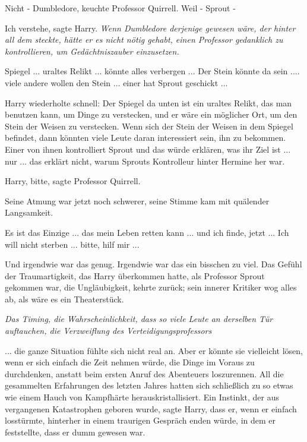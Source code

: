 \glqq{}Nicht - Dumbledore\grqq{}, keuchte Professor Quirrell. \glqq{}Weil - Sprout
-\grqq{}

\glqq{}Ich verstehe\grqq{}, sagte Harry. \emph{Wenn Dumbledore derjenige gewesen
wäre, der hinter all dem steckte, hätte er es nicht nötig gehabt, einen
Professor gedanklich zu kontrollieren, um Gedächtniszauber einzusetzen.}

\glqq{}Spiegel ... uraltes Relikt ... könnte alles verbergen ... Der Stein könnte da
sein .... viele andere wollen den Stein ... einer hat Sprout geschickt ...\grqq{}

Harry wiederholte schnell: \glqq{}Der Spiegel da unten ist ein uraltes Relikt,
das man benutzen kann, um Dinge zu verstecken, und er wäre ein möglicher Ort, um
den Stein der Weisen zu verstecken. Wenn sich der Stein der Weisen in dem
Spiegel befindet, dann könnten viele Leute daran interessiert sein, ihn zu
bekommen. Einer von ihnen kontrolliert Sprout und das würde erklären, was ihr
Ziel ist ... nur ... das erklärt nicht, warum Sprouts Kontrolleur hinter Hermine
her war.\grqq{}

\glqq{}Harry, bitte\grqq{}, sagte Professor Quirrell.

Seine Atmung war jetzt noch schwerer, seine Stimme kam mit quälender
Langsamkeit.

\glqq{}Es ist das Einzige ... das mein Leben retten kann ... und ich finde,
jetzt ... Ich will nicht sterben ... bitte, hilf mir ...\grqq{}

Und irgendwie war das genug. Irgendwie war das ein bisschen zu viel. Das Gefühl
der Traumartigkeit, das Harry überkommen hatte, als Professor Sprout gekommen
war, die Ungläubigkeit, kehrte zurück; sein innerer Kritiker wog alles ab, als
wäre es ein Theaterstück.

\emph{Das Timing, die Wahrscheinlichkeit, dass so viele Leute an derselben Tür
auftauchen, die Verzweiflung des Verteidigungsprofessors}

... die ganze Situation fühlte sich nicht real an. Aber er könnte sie vielleicht
lösen, wenn er sich einfach die Zeit nehmen würde, die Dinge im Voraus zu
durchdenken, anstatt beim ersten Anruf des Abenteuers loszurennen. All die
gesammelten Erfahrungen des letzten Jahres hatten sich schließlich zu so etwas
wie einem Hauch von Kampfhärte herauskristallisiert. Ein Instinkt, der aus
vergangenen Katastrophen geboren wurde, sagte Harry, dass er, wenn er einfach
losstürmte, hinterher in einem traurigen Gespräch enden würde, in dem er
feststellte, dass er dumm gewesen war.

